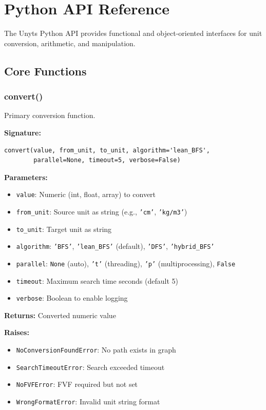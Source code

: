 \documentclass[11pt,a4paper]{report}
\begin{document}
\chapter{Python API Reference}

The Unyts Python API provides functional and object-oriented interfaces for unit conversion, arithmetic, and manipulation.

\section{Core Functions}

\subsection{convert()}

Primary conversion function.

\textbf{Signature:}
\begin{lstlisting}[style=pythonstyle]
convert(value, from_unit, to_unit, algorithm='lean_BFS', 
        parallel=None, timeout=5, verbose=False)
\end{lstlisting}

\textbf{Parameters:}
\begin{itemize}
\item \texttt{value}: Numeric (int, float, array) to convert
\item \texttt{from\_unit}: Source unit as string (e.g., \texttt{'cm'}, \texttt{'kg/m3'})
\item \texttt{to\_unit}: Target unit as string
\item \texttt{algorithm}: \texttt{'BFS'}, \texttt{'lean\_BFS'} (default), \texttt{'DFS'}, \texttt{'hybrid\_BFS'}
\item \texttt{parallel}: \texttt{None} (auto), \texttt{'t'} (threading), \texttt{'p'} (multiprocessing), \texttt{False}
\item \texttt{timeout}: Maximum search time seconds (default 5)
\item \texttt{verbose}: Boolean to enable logging
\end{itemize}

\textbf{Returns:} Converted numeric value

\textbf{Raises:}
\begin{itemize}
\item \texttt{NoConversionFoundError}: No path exists in graph
\item \texttt{SearchTimeoutError}: Search exceeded timeout
\item \texttt{NoFVFError}: FVF required but not set
\item \texttt{WrongFormatError}: Invalid unit string format
\end{itemize}
\end{document}

